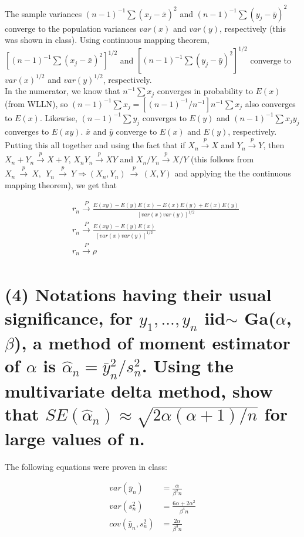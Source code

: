\documentclass[11pt]{article}
\begin{document}
The sample variances $(n-1)^{-1}\sum (x_j-\bar{x})^2$ and $(n-1)^{-1}\sum (y_j-\bar{y})^2$ converge to the population variances $var(x)$ and $var(y)$, respectively (this was shown in class). Using continuous mapping theorem, $[(n-1)^{-1}\sum (x_j-\bar{x})^2]^{1/2}$ and $[(n-1)^{-1}\sum (y_j-\bar{y})^2]^{1/2}$ converge to $var(x)^{1/2}$ and $var(y)^{1/2}$, respectively.\\

In the numerator, we know that $n^{-1} \sum x_j$ converges in probability to $E(x)$ (from WLLN), so $(n-1)^{-1} \sum x_j = [(n-1)^{-1}/n^{-1}] n^{-1} \sum x_j$ also converges to $E(x)$. Likewise, $(n-1)^{-1} \sum y_j$ converges to $E(y)$ and $(n-1)^{-1} \sum x_j y_j$ converges to $E(xy)$. $\bar{x}$ and $\bar{y}$ converge to $E(x)$ and $E(y)$, respectively. Putting this all together
and using the fact that  if $X_{n} \xrightarrow {\overset {}{p}} X$ and  $Y_{n} \xrightarrow {\overset {}{p}} Y$, then $X_{n} + Y_{n} \xrightarrow {\overset {}{p}} X + Y$, $X_{n} Y_{n} \xrightarrow {\overset {}{p}} X Y$  and $X_{n} /Y_{n} \xrightarrow {\overset {}{p}} X/ Y$ (this follows from ${\displaystyle X_{n}\ {\xrightarrow {\overset {}{p}}}\ X,\ \ Y_{n}\ {\xrightarrow {\overset {}{p}}}\ Y \Rightarrow(X_{n},Y_{n})\ {\xrightarrow {\overset {}{p}}}\ (X,Y)}$ and applying the the continuous mapping theorem), we get that 

\begin{align*}
    &r_n \xrightarrow[]{P} \frac{E(xy)-E(y)E(x)-E(x)E(y)+E(x)E(y)}{[var(x)var(y)]^{1/2}}\\
    &r_n \xrightarrow[]{P} \frac{E(xy)-E(y)E(x)}{[var(x)var(y)]^{1/2}}\\
     &r_n \xrightarrow[]{P} \rho
\end{align*}


\section*{(4) Notations having their usual significance, for $y_1,...,y_n$
iid$\sim$ Ga($\alpha$,$\beta$), a
method of moment estimator of $\alpha$ is $\hat{\alpha}_n=\bar{y}^2_n / s^2_n$. Using the multivariate delta method, show that $SE(\hat{\alpha}_n) \approx \sqrt{2\alpha(\alpha+1)/n}$ for large values of n.}

 
The following equations were proven in class:

\begin{align*}
var(\bar{y}_n) &= \frac{\alpha}{\beta^2n}\\
var(s^2_n) &=\frac{6\alpha+2\alpha^2}{\beta^4n}\\
cov(\bar{y}_n, s^2_n) &= \frac{2\alpha}{\beta^3n}
    \end{align*}
    
\end{document}
